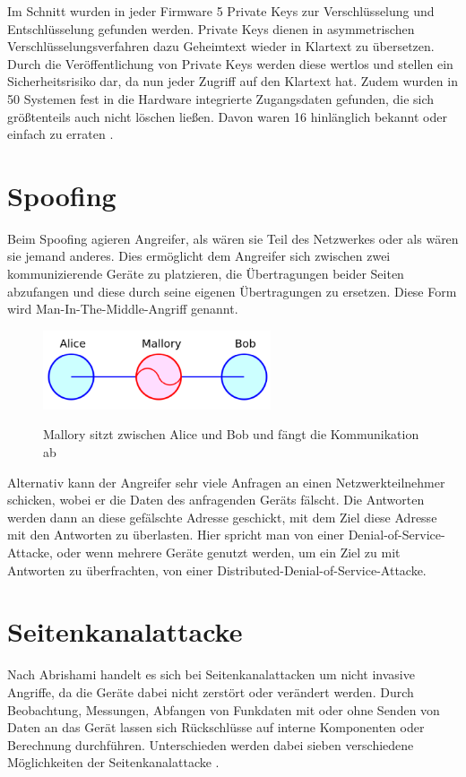 \documentclass[12pt, a4paper, onecolumn, oneside, toc=bibliographynumbered, liststotoc]{scrreprt} %
\begin{document}
 Im Schnitt wurden in jeder Firmware 5 Private Keys zur Verschlüsselung und Entschlüsselung gefunden werden. Private Keys dienen in asymmetrischen Verschlüsselungsverfahren dazu Geheimtext wieder in Klartext zu übersetzen. Durch die Veröffentlichung von Private Keys werden diese wertlos und stellen ein Sicherheitsrisiko dar, da nun jeder Zugriff auf den Klartext hat. Zudem wurden in 50 Systemen fest in die Hardware integrierte Zugangsdaten gefunden, die sich größtenteils auch nicht löschen ließen. Davon waren 16 hinlänglich bekannt oder einfach zu erraten \parencite{FrauenhoferFKIE.2020}.

		\section{Spoofing}
  Beim Spoofing agieren Angreifer, als wären sie Teil des Netzwerkes oder als wären sie jemand anderes. Dies ermöglicht dem Angreifer sich zwischen zwei kommunizierende Geräte zu platzieren, die Übertragungen beider Seiten abzufangen und diese durch seine eigenen Übertragungen zu ersetzen. Diese Form wird Man-In-The-Middle-Angriff genannt.
   
\begin{figure}[H]
	\centering
	\caption{Mallory sitzt zwischen Alice und Bob und fängt die Kommunikation ab}
	\includegraphics[width=0.6\textwidth]{MITM.png}
	\label{MITM}
    \end{figure} 
    
  Alternativ kann der Angreifer sehr viele Anfragen an einen Netzwerkteilnehmer schicken, wobei er die Daten des anfragenden Geräts fälscht. Die Antworten werden dann an diese gefälschte Adresse geschickt, mit dem Ziel diese Adresse mit den Antworten zu überlasten. Hier spricht man von einer Denial-of-Service-Attacke, oder wenn mehrere Geräte genutzt werden, um ein Ziel zu mit Antworten zu überfrachten, von einer Distributed-Denial-of-Service-Attacke.
  
		\section{Seitenkanalattacke}
  Nach Abrishami handelt es sich bei Seitenkanalattacken um nicht invasive Angriffe, da die Geräte dabei nicht zerstört oder verändert werden. Durch Beobachtung, Messungen, Abfangen von Funkdaten mit oder ohne Senden von Daten an das Gerät lassen sich Rückschlüsse auf interne Komponenten oder Berechnung durchführen. Unterschieden werden dabei sieben verschiedene Möglichkeiten der Seitenkanalattacke \parencite{Abrishamchi.2017}.
  
\end{document}
